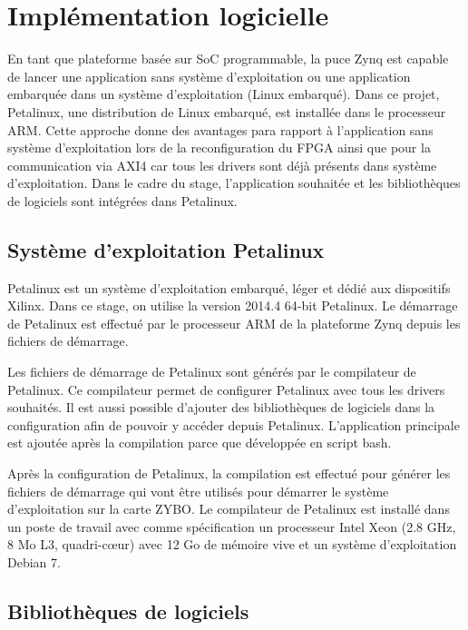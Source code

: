 \section{Implémentation logicielle}
\label{sec:logiciel}
En tant que plateforme basée sur SoC programmable, la puce Zynq est capable de lancer une application sans système d'exploitation
ou une application embarquée dans un système d'exploitation (Linux embarqué). Dans ce projet,
Petalinux, une distribution de Linux embarqué, est installée dans le processeur ARM.
Cette approche donne des avantages para rapport à l'application sans 
système d'exploitation lors de la reconfiguration du FPGA ainsi que pour la communication via
AXI4 car tous les drivers sont déjà présents dans système d'exploitation.
Dans le cadre du stage, l'application souhaitée et les bibliothèques de logiciels
sont intégrées dans Petalinux.

\subsection{Système d'exploitation Petalinux} %
\label{subsec:petalinux}
Petalinux est un système d'exploitation embarqué, léger et dédié aux dispositifs Xilinx. 
Dans ce stage, on utilise la version 2014.4 64-bit Petalinux.
Le démarrage de Petalinux est effectué par le processeur ARM de la plateforme Zynq depuis
les fichiers de démarrage. 

Les fichiers de démarrage de Petalinux sont générés par le compilateur de Petalinux.
Ce compilateur permet de configurer Petalinux avec tous les drivers souhaités.
Il est aussi possible d'ajouter des bibliothèques de logiciels dans la configuration
afin de pouvoir y accéder depuis Petalinux. 
L'application principale est ajoutée après la compilation parce que développée
en script bash.

Après la configuration de Petalinux, la compilation est effectué pour générer les fichiers de démarrage
qui vont être utilisés pour démarrer le système d'exploitation sur la carte ZYBO.
Le compilateur de Petalinux est installé dans un poste de travail avec comme spécification un 
processeur Intel Xeon (2.8 GHz, 8 Mo L3, quadri-cœur)
avec 12 Go de mémoire vive et un système d'exploitation Debian 7.

\subsection{Bibliothèques de logiciels} %
\label{subsec:embedded}

